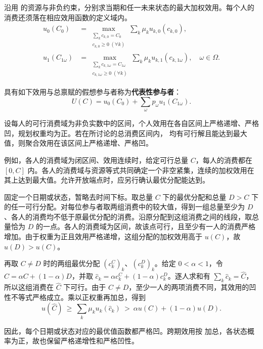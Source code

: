 \begin{tcolorbox}[knowledge,title=代表性参与者]
沿用 的资源与非负约束，分别求当期和任一未来状态的最大加权效用。每个人的消费还须落在相应效用函数的定义域内。
\begin{subequations}\label{eq:wj-10-12}
\begin{align}
 u_0(C_0)&=\max_{\substack{\sum_k c_{k,0}=C_0\\c_{k,0}\ge0\;(\forall k)}}
           \sum_k\mu_k u_{k,0}(c_{k,0}),\label{eq:wj-10-12a}\\
 u_1(C_{1\omega})&=\max_{\substack{\sum_k c_{k,1\omega}=C_{1\omega}\\
                       c_{k,1\omega}\ge0\;(\forall k)}}
           \sum_k\mu_k u_{k,1}(c_{k,1\omega}),\quad\omega\in\Omega.\label{eq:wj-10-12b}
\end{align}
\end{subequations}

具有如下效用与总禀赋的假想参与者称为\textbf{代表性参与者}：
\begin{equation}
 U(C)=u_0(C_0)+\sum_\omega p_\omega u_1(C_{1\omega}).
 \label{eq:wj-10-13}
\end{equation}
\end{tcolorbox}

\begin{tcolorbox}[knowledge]
 设每人的可行消费域为非负实数中的区间，个人效用在各自区间上严格递增、严格凹，规划权重均为正。若在所讨论的总消费区间内， 均有可行解且能达到最大值，则聚合效用在该区间上严格递增、严格凹。
\end{tcolorbox}

例如，各人的消费域为闭区间、效用连续时，给定可行总量 $C$，每人的消费都在 $[0,C]$ 内。各人的消费域与资源等式共同确定一个非空紧集，连续的加权效用在其上达到最大值。允许开放端点时，应另行确认最优分配能达到。

\begin{solution}[label-content={证明},blank-type=none]
固定一个日期或状态，暂略去时间下标。取总量 $C$ 下的最优分配和总量 $D>C$ 下的任一可行分配。对每位参与者取两组消费中的较大值，得到一组总量至少为 $D$、各人的消费均不低于原最优分配的消费。沿原分配到这组消费之间的线段，取总量恰为 $D$ 的一点。各人的消费域为区间，故该点可行，且至少有一人的消费严格增加。由于权重为正且效用严格递增，这组分配的加权效用高于 $u(C)$，故 $u(D)>u(C)$。

再取 $C\ne D$ 时的两组最优分配 $(c_k^C)_k$、$(c_k^D)_k$。给定 $0<\alpha<1$，令 $\widehat C=\alpha C+(1-\alpha)D$，并取 $\widehat c_k=\alpha c_k^C+(1-\alpha)c_k^D$。逐人求和有 $\sum_k\widehat c_k=\widehat C$，所以这组消费在 $\widehat C$ 下可行。由于 $C\ne D$，至少一人的两项消费不同，其效用的凹性不等式严格成立。乘以正权重再加总，得到
\[
 u(\widehat C)\ \ge\ \sum_k\mu_k u_k(\widehat c_k)\
 >\ \alpha u(C)+(1-\alpha)u(D).
\]

因此，每个日期或状态对应的最优值函数都严格凹。跨期效用按 加总，各状态概率为正，故也保留严格递增性和严格凹性。
\end{solution}

